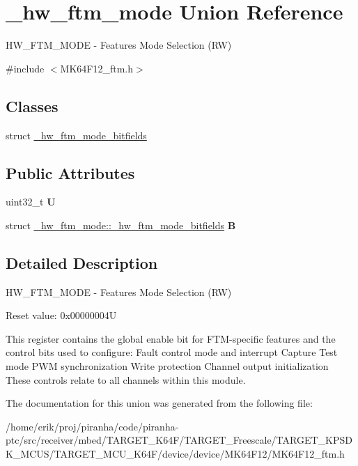 \hypertarget{union__hw__ftm__mode}{}\section{\+\_\+hw\+\_\+ftm\+\_\+mode Union Reference}
\label{union__hw__ftm__mode}


H\+W\+\_\+\+F\+T\+M\+\_\+\+M\+O\+DE -\/ Features Mode Selection (RW)  




{\ttfamily \#include $<$M\+K64\+F12\+\_\+ftm.\+h$>$}

\subsection*{Classes}
\begin{DoxyCompactItemize}
\item 
struct \hyperlink{struct__hw__ftm__mode_1_1__hw__ftm__mode__bitfields}{\+\_\+hw\+\_\+ftm\+\_\+mode\+\_\+bitfields}
\end{DoxyCompactItemize}
\subsection*{Public Attributes}
\begin{DoxyCompactItemize}
\item 
uint32\+\_\+t {\bfseries U}\hypertarget{union__hw__ftm__mode_ab5a52eab15ae38bcdd95523627e2ac4c}{}\label{union__hw__ftm__mode_ab5a52eab15ae38bcdd95523627e2ac4c}

\item 
struct \hyperlink{struct__hw__ftm__mode_1_1__hw__ftm__mode__bitfields}{\+\_\+hw\+\_\+ftm\+\_\+mode\+::\+\_\+hw\+\_\+ftm\+\_\+mode\+\_\+bitfields} {\bfseries B}\hypertarget{union__hw__ftm__mode_a48f1ab4dea0a44ffa739c3e233c27265}{}\label{union__hw__ftm__mode_a48f1ab4dea0a44ffa739c3e233c27265}

\end{DoxyCompactItemize}


\subsection{Detailed Description}
H\+W\+\_\+\+F\+T\+M\+\_\+\+M\+O\+DE -\/ Features Mode Selection (RW) 

Reset value\+: 0x00000004U

This register contains the global enable bit for F\+T\+M-\/specific features and the control bits used to configure\+: Fault control mode and interrupt Capture Test mode P\+WM synchronization Write protection Channel output initialization These controls relate to all channels within this module. 

The documentation for this union was generated from the following file\+:\begin{DoxyCompactItemize}
\item 
/home/erik/proj/piranha/code/piranha-\/ptc/src/receiver/mbed/\+T\+A\+R\+G\+E\+T\+\_\+\+K64\+F/\+T\+A\+R\+G\+E\+T\+\_\+\+Freescale/\+T\+A\+R\+G\+E\+T\+\_\+\+K\+P\+S\+D\+K\+\_\+\+M\+C\+U\+S/\+T\+A\+R\+G\+E\+T\+\_\+\+M\+C\+U\+\_\+\+K64\+F/device/device/\+M\+K64\+F12/M\+K64\+F12\+\_\+ftm.\+h\end{DoxyCompactItemize}
